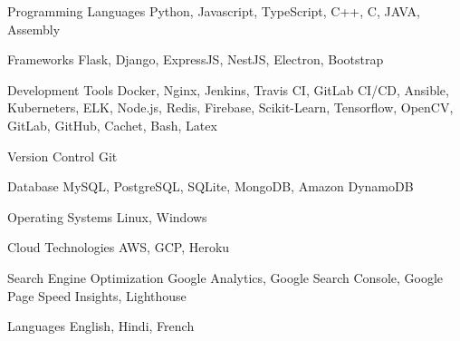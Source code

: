 

\begin{cvskills}

  \cvskill
    {Programming Languages} %
    {Python, Javascript, TypeScript, C++, C, JAVA, Assembly} %
    
  \cvskill
    {Frameworks} %
    {Flask, Django, ExpressJS, NestJS, Electron, Bootstrap} %

  \cvskill
    {Development Tools} %
    {Docker, Nginx, Jenkins, Travis CI, GitLab CI/CD, Ansible, Kuberneters, ELK, Node.js, Redis, Firebase, Scikit-Learn, Tensorflow, OpenCV, GitLab, GitHub, Cachet, Bash, Latex} %
    
  \cvskill
    {Version Control} %
    {Git} %
    
  \cvskill
    {Database} %
    {MySQL, PostgreSQL, SQLite, MongoDB, Amazon DynamoDB} %

  \cvskill
    {Operating Systems} %
    {Linux, Windows} %

  \cvskill
    {Cloud Technologies} %
    {AWS, GCP, Heroku} %

  \cvskill
    {Search Engine Optimization} %
    {Google Analytics, Google Search Console, Google Page Speed Insights, Lighthouse} %
    
  \cvskill
    {Languages} %
    {English, Hindi, French} %

\end{cvskills}
